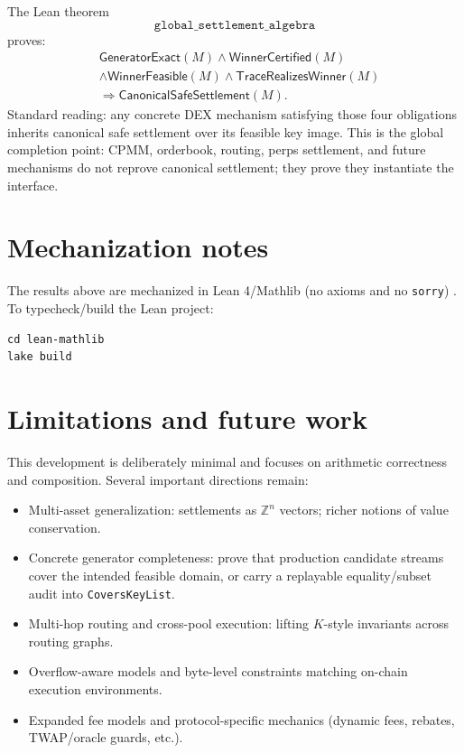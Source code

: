 \documentclass[11pt]{article}
\theoremstyle{remark}
\newcommand{\Z}{\mathbb{Z}}
\begin{document}
The Lean theorem
\[
  \texttt{global\_settlement\_algebra}
\]
proves:
\[
\begin{aligned}
  &\mathsf{GeneratorExact}(M)
  \land \mathsf{WinnerCertified}(M)\\
  &\land \mathsf{WinnerFeasible}(M)
  \land \mathsf{TraceRealizesWinner}(M)\\
  &\Longrightarrow \mathsf{CanonicalSafeSettlement}(M).
\end{aligned}
\]
Standard reading: any concrete DEX mechanism satisfying those four obligations
inherits canonical safe settlement over its feasible key image.  This is the
global completion point: CPMM, orderbook, routing, perps settlement, and future
mechanisms do not reprove canonical settlement; they prove they instantiate the
interface.

\section{Mechanization notes}
\label{sec:mechanization}

The results above are mechanized in Lean 4/Mathlib (no axioms and no \texttt{sorry}) \cite{lean4book}.
To typecheck/build the Lean project:
\begin{verbatim}
cd lean-mathlib
lake build
\end{verbatim}

\section{Limitations and future work}
\label{sec:future}

This development is deliberately minimal and focuses on arithmetic correctness and composition.
Several important directions remain:
\begin{itemize}[leftmargin=2em]
  \item Multi-asset generalization: settlements as $\Z^n$ vectors; richer notions of value conservation.
  \item Concrete generator completeness: prove that production candidate streams cover the intended feasible domain,
        or carry a replayable equality/subset audit into \texttt{CoversKeyList}.
  \item Multi-hop routing and cross-pool execution: lifting $K$-style invariants across routing graphs.
  \item Overflow-aware models and byte-level constraints matching on-chain execution environments.
  \item Expanded fee models and protocol-specific mechanics (dynamic fees, rebates, TWAP/oracle guards, etc.).
\end{itemize}



\end{document}
